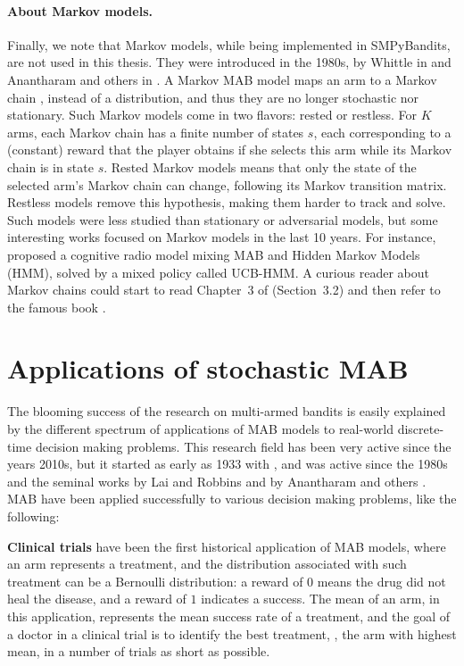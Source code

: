 \paragraph{About Markov models.}
%
Finally, we note that Markov models, while being implemented in SMPyBandits, are not used in this thesis.
They were introduced in the 1980s, by Whittle in \cite{Whittle1988} and Anantharam and others in \cite{Anantharam87b}.
A Markov MAB model maps an arm to a Markov chain \cite{Norris98}, instead of a distribution, and thus they are no longer stochastic nor stationary.
Such Markov models come in two flavors: rested or restless.
For $K$ arms, each Markov chain has a finite number of states $s$, each corresponding to a (constant) reward that the player obtains if she selects this arm while its Markov chain is in state $s$.
Rested Markov models means that only the state of the selected arm's Markov chain can change, following its Markov transition matrix.
Restless models remove this hypothesis, making them harder to track and solve.
%
Such models were less studied than stationary or adversarial models, but some interesting works focused on Markov models in the last 10 years.
For instance, \cite{Melian15} proposed a cognitive radio model mixing MAB and Hidden Markov Models (HMM), solved by a mixed policy called UCB-HMM.
A curious reader about Markov chains could start to read Chapter~3 of \cite{LattimoreBanditAlgorithmsBook} (Section~3.2) and then refer to the famous book \cite{Norris98}.


\section{Applications of stochastic MAB}
\label{sec:2:applicationsofStochasticMAB}

The blooming success of the research on multi-armed bandits is easily explained by the different spectrum of applications of MAB models to real-world discrete-time decision making problems.
This research field has been very active since the years 2010s, but it started as early as 1933 with \cite{Thompson33}, and was active since the 1980s and the seminal works by Lai and Robbins \cite{LaiRobbins85} and by Anantharam and others \cite{Anantharam87a}.
%
MAB have been applied successfully to various decision making problems, like the following:

\textbf{Clinical trials} have been the first historical application of MAB models, where an arm represents a treatment, and the distribution associated with such treatment can be a Bernoulli distribution: a reward of $0$ means the drug did not heal the disease, and a reward of $1$ indicates a success. The mean of an arm, in this application, represents the mean success rate of a treatment, and the goal of a doctor in a clinical trial is to identify the best treatment, \ie, the arm with highest mean, in a number of trials as short as possible.
%

